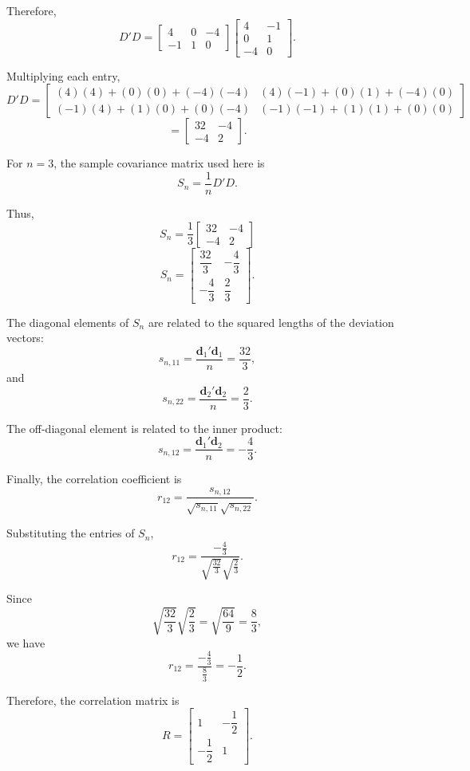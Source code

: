 \documentclass[12pt]{article}
\begin{document}
	Therefore,
	\[
	D'D
	=
	\begin{bmatrix}
		4&0&-4\\
		-1&1&0
	\end{bmatrix}
	\begin{bmatrix}
		4&-1\\
		0&1\\
		-4&0
	\end{bmatrix}.
	\]
	
	Multiplying each entry,
	\[
	D'D
	=
	\begin{bmatrix}
		(4)(4)+(0)(0)+(-4)(-4)
		&
		(4)(-1)+(0)(1)+(-4)(0)
		\\[6pt]
		(-1)(4)+(1)(0)+(0)(-4)
		&
		(-1)(-1)+(1)(1)+(0)(0)
	\end{bmatrix}
	\]
	\[
	=
	\begin{bmatrix}
		32&-4\\
		-4&2
	\end{bmatrix}.
	\]
	
	For \(n=3\), the sample covariance matrix used here is
	\[
	S_n=\frac{1}{n}D'D.
	\]
	
	Thus,
	\[
	S_n
	=
	\frac13
	\begin{bmatrix}
		32&-4\\
		-4&2
	\end{bmatrix}
	\]
	\[
	\boxed{
		S_n=
		\begin{bmatrix}
			\dfrac{32}{3}&-\dfrac43\\[6pt]
			-\dfrac43&\dfrac23
	\end{bmatrix}}.
	\]
	
	The diagonal elements of \(S_n\) are related to the squared
	lengths of the deviation vectors:
	\[
	s_{n,11}
	=
	\frac{\mathbf{d}_1'\mathbf{d}_1}{n}
	=
	\frac{32}{3},
	\]
	and
	\[
	s_{n,22}
	=
	\frac{\mathbf{d}_2'\mathbf{d}_2}{n}
	=
	\frac{2}{3}.
	\]
	
	The off-diagonal element is related to the inner product:
	\[
	s_{n,12}
	=
	\frac{\mathbf{d}_1'\mathbf{d}_2}{n}
	=
	-\frac43.
	\]
	
	Finally, the correlation coefficient is
	\[
	r_{12}
	=
	\frac{s_{n,12}}
	{\sqrt{s_{n,11}}\sqrt{s_{n,22}}}.
	\]
	
	Substituting the entries of \(S_n\),
	\[
	r_{12}
	=
	\frac{-\frac43}
	{\sqrt{\frac{32}{3}}
		\sqrt{\frac23}}.
	\]
	
	Since
	\[
	\sqrt{\frac{32}{3}}
	\sqrt{\frac23}
	=
	\sqrt{\frac{64}{9}}
	=
	\frac83,
	\]
	we have
	\[
	r_{12}
	=
	\frac{-\frac43}{\frac83}
	=
	\boxed{-\frac12}.
	\]
	
	Therefore, the correlation matrix is
	\[
	\boxed{
		R=
		\begin{bmatrix}
			1&-\dfrac12\\[4pt]
			-\dfrac12&1
	\end{bmatrix}}.
	\]
	
\end{document}
